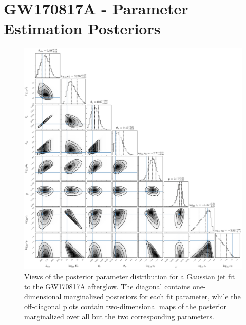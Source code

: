 \documentclass[twocolumn]{aastex62}
\newcommand{\gwbns}{GW170817A}
\newcommand{\epse}{\ensuremath{\varepsilon_{\mathrm{e}}}}
\newcommand{\epsB}{\ensuremath{\varepsilon_{\mathrm{B}}}}
\newcommand{\som}{\ensuremath{s_{\Omega}}}
\begin{document}
%

\section{GW170817A - Parameter Estimation Posteriors}\label{sec:corners}

\begin{figure}
	\includegraphics[width=\textwidth]{figs/cornerGaussian.pdf}
	\caption{Views of the posterior parameter distribution for a Gaussian jet fit to the \gwbns{} afterglow.  The diagonal contains one-dimensional marginalized posteriors for each fit parameter, while the off-diagonal plots contain two-dimensional maps of the posterior marginalized over all but the two corresponding parameters. \label{fig:cornerGaussian}}
\end{figure}
\end{document}
